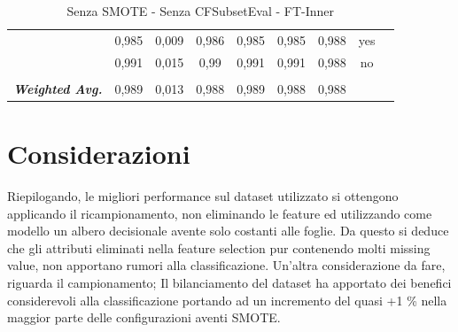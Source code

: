 \begin{table}[htbp]
{\begin{tabular}{rrrrrrrrr}
			\multicolumn{1}{c}{} & \multicolumn{1}{c}{0,985} & \multicolumn{1}{c}{0,009} & \multicolumn{1}{c}{0,986} & \multicolumn{1}{c}{0,985} & \multicolumn{1}{c}{0,985} & \multicolumn{1}{c}{0,988} & \multicolumn{1}{c}{yes} &  \\
			\multicolumn{1}{c}{} & \multicolumn{1}{c}{0,991} & \multicolumn{1}{c}{0,015} & \multicolumn{1}{c}{0,99} & \multicolumn{1}{c}{0,991} & \multicolumn{1}{c}{0,991} & \multicolumn{1}{c}{0,988} & \multicolumn{1}{c}{no} &  \\
			\multicolumn{1}{c}{} & \multicolumn{1}{c}{} & \multicolumn{1}{c}{} & \multicolumn{1}{c}{} & \multicolumn{1}{c}{} & \multicolumn{1}{c}{} & \multicolumn{1}{c}{} & \multicolumn{1}{c}{} &  \\
			\multicolumn{1}{c}{\textit{\textbf{Weighted Avg.}}} & \multicolumn{1}{c}{0,989} & \multicolumn{1}{c}{0,013} & \multicolumn{1}{c}{0,988} & \multicolumn{1}{c}{0,989} & \multicolumn{1}{c}{0,988} & \multicolumn{1}{c}{0,988} & \multicolumn{1}{c}{} &  \\
		\end{tabular}%
	}
	\label{tab:FTInner}%
	\caption{Senza SMOTE - Senza CFSubsetEval - FT-Inner}
\end{table}%

\section{Considerazioni}
Riepilogando, le migliori performance sul dataset utilizzato si ottengono applicando il ricampionamento, non eliminando le feature ed utilizzando come modello un albero decisionale avente solo costanti alle foglie.
Da questo si deduce che gli attributi eliminati nella feature selection pur contenendo molti missing value, non apportano rumori alla classificazione.
Un'altra considerazione da fare, riguarda il campionamento; Il bilanciamento del dataset ha apportato dei benefici considerevoli alla classificazione portando ad un incremento del quasi +1 \% nella maggior parte delle configurazioni aventi SMOTE.

